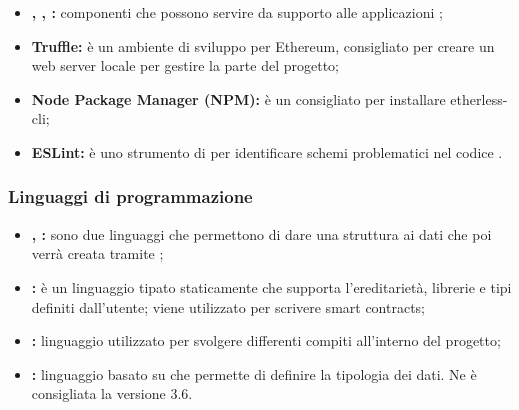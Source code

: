 \begin{itemize}
    		 	\item \textbf{, , : }componenti che possono servire da supporto alle applicazioni ;
    		 	\item \textbf{Truffle: }è un ambiente di sviluppo per Ethereum, consigliato per creare un web server locale per gestire la parte  del progetto;
    		 	\item \textbf{Node Package Manager (NPM): }è un  consigliato per installare etherless-cli;
    			\item \textbf{ESLint: }è uno strumento di  per identificare schemi problematici nel codice .

		\end{itemize}
	\subsubsection{Linguaggi di programmazione}
        	\begin{itemize}
        		\item \textbf{, : }sono due linguaggi che permettono di dare una struttura ai dati che poi verrà creata tramite ;
        		\item \textbf{: }è un linguaggio tipato staticamente che supporta l'ereditarietà, librerie e tipi definiti dall'utente; viene utilizzato per scrivere smart contracts;
        		\item \textbf{: }linguaggio utilizzato per svolgere differenti compiti all'interno del progetto;
        		\item \textbf{: }linguaggio basato su  che permette di definire la tipologia dei dati. Ne è consigliata la versione 3.6.
        \end{itemize}

